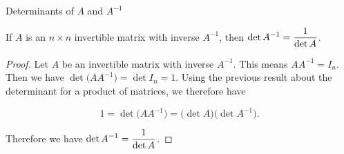 \documentclass[xcolor=dvipsnames,aspectratio=169,t]{beamer}
\begin{document}
\begin{frame}{Determinants of $A$ and $A^{-1}$}

\bbox
If $A$ is an $n \times n$ invertible matrix with inverse $A^{-1}$, then \alert{$\displaystyle \det A^{-1} = \frac{1}{\det A}$.}
\ebox

\pause
\begin{proof}
Let $A$ be an invertible matrix with inverse $A^{-1}$. This means $AA^{-1} = I_n$. Then we have $\det \big( AA^{-1} \big) = \det I_n =1$. Using the previous result about the determinant for a product of matrices, we therefore have

\[ 1 = \det \big( AA^{-1} \big) = \big( \det A \big)  \big( \det A^{-1} \big).\]

Therefore we have \alert{$\displaystyle \det A^{-1} = \frac{1}{\det A}$}.
\end{proof}
\end{frame}
\end{document}

